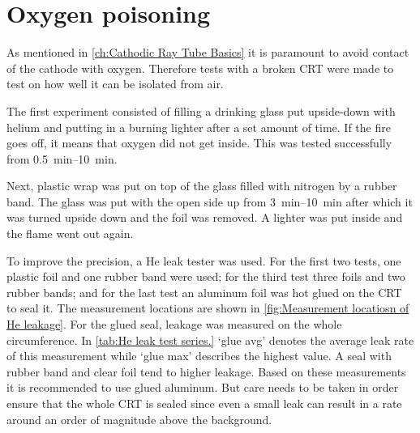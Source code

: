 \section{Oxygen poisoning}
\label{sec:Oxygen poisoning}


As mentioned in \cref{ch:Cathodic Ray Tube Basics} it is paramount to avoid contact of the cathode with oxygen. Therefore tests with a broken CRT were made to test on how well it can be isolated from air.

The first experiment consisted of filling a drinking glass put upside-down with helium and putting in a burning lighter after a set amount of time. If the fire goes off, it means that oxygen did not get inside. This was tested successfully from \SIrange{0.5}{10}{\minute}.

Next, plastic wrap was put on top of the glass filled with nitrogen by a rubber band. The glass was put with the open side up from \SIrange{3}{10}{\minute} after which it was turned upside down and the foil was removed. A lighter was put inside and the flame went out again.

To improve the precision, a He leak tester was used. For the first two tests, one plastic foil and one rubber band were used; for the third test three foils and two rubber bands; and for the last test an aluminum foil was hot glued on the CRT to seal it. The measurement locations are shown in \cref{fig:Measurement locatiosn of He leakage}. For the glued seal, leakage was measured on the whole circumference. In \cref{tab:He leak test series.} `glue avg' denotes the average leak rate of this measurement while `glue max' describes the highest value. A seal with rubber band and clear foil tend to higher leakage. Based on these measurements it is recommended to use glued aluminum. But care needs to be taken in order ensure that the whole CRT is sealed since even a small leak can result in a rate around an order of magnitude above the background.

